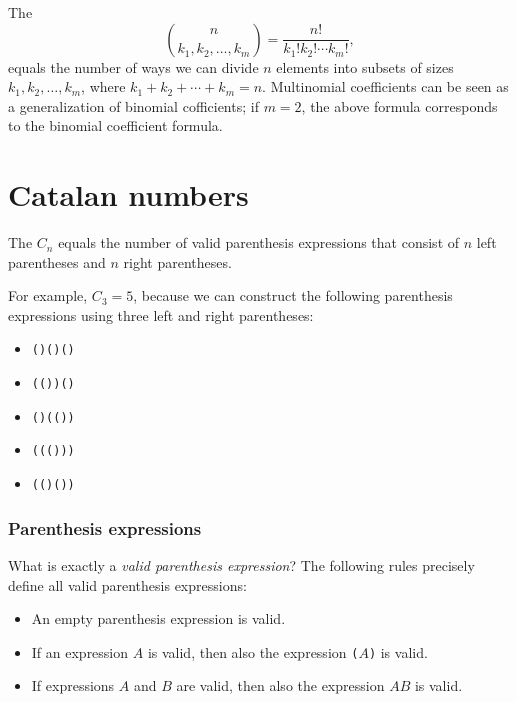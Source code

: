 
The 
\[ \binom{n}{k_1,k_2,\ldots,k_m} = \frac{n!}{k_1! k_2! \cdots k_m!}, \]
equals the number of ways
we can divide $n$ elements into subsets
of sizes $k_1,k_2,\ldots,k_m$,
where $k_1+k_2+\cdots+k_m=n$.
Multinomial coefficients can be seen as a
generalization of binomial cofficients;
if $m=2$, the above formula
corresponds to the binomial coefficient formula.

\section{Catalan numbers}


The 
$C_n$ equals the
number of valid
parenthesis expressions that consist of
$n$ left parentheses and $n$ right parentheses.

For example, $C_3=5$, because
we can construct the following parenthesis
expressions using three
left and right parentheses:

\begin{itemize}[noitemsep]
    \item \texttt{()()()}
    \item \texttt{(())()}
    \item \texttt{()(())}
    \item \texttt{((()))}
    \item \texttt{(()())}
\end{itemize}

\subsubsection{Parenthesis expressions}


What is exactly a \emph{valid parenthesis expression}?
The following rules precisely define all
valid parenthesis expressions:

\begin{itemize}
    \item An empty parenthesis expression is valid.
    \item If an expression $A$ is valid,
          then also the expression
          \texttt{(}$A$\texttt{)} is valid.
    \item If expressions $A$ and $B$ are valid,
          then also the expression $AB$ is valid.
\end{itemize}

